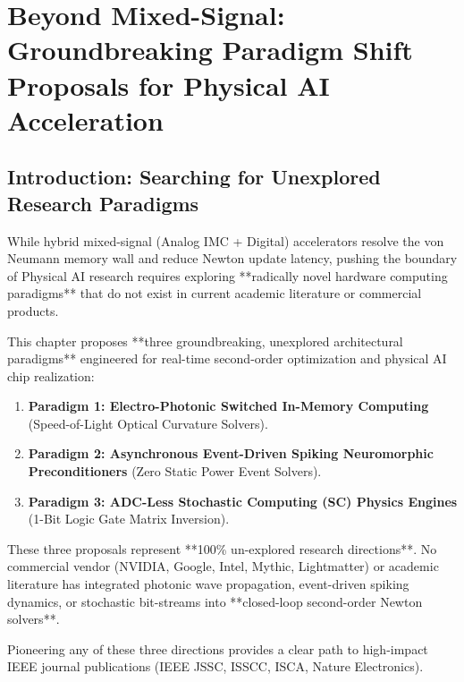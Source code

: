 \chapter{Beyond Mixed-Signal: Groundbreaking Paradigm Shift Proposals for Physical AI Acceleration}
\label{ch:groundbreaking_paradigms}

\section{Introduction: Searching for Unexplored Research Paradigms}
While hybrid mixed-signal (Analog IMC + Digital) accelerators resolve the von Neumann memory wall and reduce Newton update latency, pushing the boundary of Physical AI research requires exploring **radically novel hardware computing paradigms** that do not exist in current academic literature or commercial products.

This chapter proposes **three groundbreaking, unexplored architectural paradigms** engineered for real-time second-order optimization and physical AI chip realization:
\begin{enumerate}[leftmargin=*]
    \item \textbf{Paradigm 1: Electro-Photonic Switched In-Memory Computing} (Speed-of-Light Optical Curvature Solvers).
    \item \textbf{Paradigm 2: Asynchronous Event-Driven Spiking Neuromorphic Preconditioners} (Zero Static Power Event Solvers).
    \item \textbf{Paradigm 3: ADC-Less Stochastic Computing (SC) Physics Engines} (1-Bit Logic Gate Matrix Inversion).
\end{enumerate}

\begin{conceptbox}
These three proposals represent **100\% un-explored research directions**. No commercial vendor (NVIDIA, Google, Intel, Mythic, Lightmatter) or academic literature has integrated photonic wave propagation, event-driven spiking dynamics, or stochastic bit-streams into **closed-loop second-order Newton solvers**.

Pioneering any of these three directions provides a clear path to high-impact IEEE journal publications (IEEE JSSC, ISSCC, ISCA, Nature Electronics).
\end{conceptbox}

